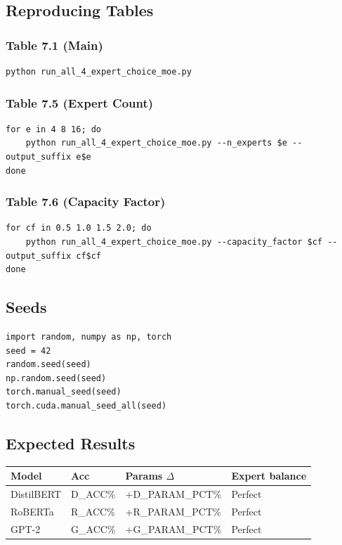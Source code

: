\subsection{Reproducing Tables}

\subsubsection{Table 7.1 (Main)}
\begin{lstlisting}
python run_all_4_expert_choice_moe.py
\end{lstlisting}

\subsubsection{Table 7.5 (Expert Count)}
\begin{lstlisting}
for e in 4 8 16; do
    python run_all_4_expert_choice_moe.py --n_experts $e --output_suffix e$e
done
\end{lstlisting}

\subsubsection{Table 7.6 (Capacity Factor)}
\begin{lstlisting}
for cf in 0.5 1.0 1.5 2.0; do
    python run_all_4_expert_choice_moe.py --capacity_factor $cf --output_suffix cf$cf
done
\end{lstlisting}

\subsection{Seeds}

\begin{lstlisting}
import random, numpy as np, torch
seed = 42
random.seed(seed)
np.random.seed(seed)
torch.manual_seed(seed)
torch.cuda.manual_seed_all(seed)
\end{lstlisting}

\subsection{Expected Results}

\begin{table}[H]
\centering
\small
\begin{tabular}{llll}
\toprule
\textbf{Model} & \textbf{Acc} & \textbf{Params $\Delta$} & \textbf{Expert balance} \\
\midrule
DistilBERT & {{D\_ACC}}\% & +{{D\_PARAM\_PCT}}\% & Perfect \\
RoBERTa & {{R\_ACC}}\% & +{{R\_PARAM\_PCT}}\% & Perfect \\
GPT-2 & {{G\_ACC}}\% & +{{G\_PARAM\_PCT}}\% & Perfect \\
\bottomrule
\end{tabular}
\end{table}

